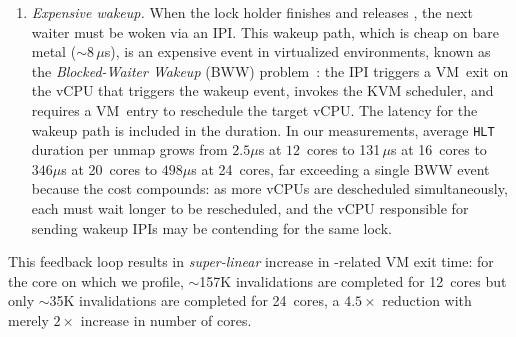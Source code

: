 \begin{enumerate}[leftmargin=*]
\item \textit{Expensive wakeup.}
  When the lock holder finishes and
  releases , the next waiter must be
  woken via an IPI.
This wakeup path, which is cheap on bare metal (${\sim}$8\,$\mu$s),
  is an expensive event in virtualized environments,
  known as the \emph{Blocked-Waiter Wakeup} (BWW) problem~\cite{Ding2014gleaner}:
  the IPI triggers a VM~exit on the vCPU that triggers the wakeup event, invokes the KVM scheduler,
  and requires a VM~entry to reschedule the target vCPU. The latency for the wakeup path is included in the  duration.
In our measurements, average \texttt{HLT} duration per unmap
  grows from $2.5\mu$s at $12$~cores to 131\,$\mu$s at 16~cores to $346\mu$s at 20~cores to $498\mu$s at 24~cores, far exceeding a single BWW event because the cost compounds:
  as more vCPUs are descheduled simultaneously, 
  each must wait longer to be rescheduled,
  and the vCPU responsible for sending wakeup IPIs
  may be contending for the same lock.
\end{enumerate}
This feedback loop results in {\it super-linear} increase in -related VM exit time:
  for the core on which we profile, ${\sim}$157K invalidations are completed for 12~cores
  but only ${\sim}$35K invalidations are completed for 24~cores, a $4.5\times$ reduction with merely $2\times$ increase in number of cores. %

